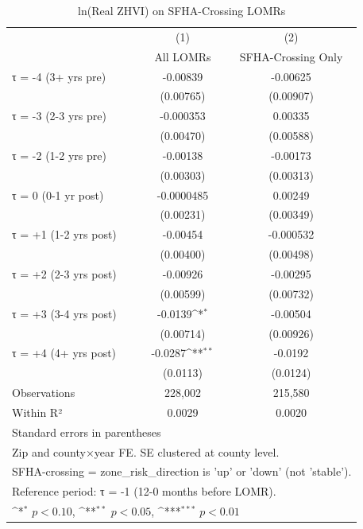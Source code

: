 \begin{table}[htbp]\centering
\def\sym#1{\ifmmode^{#1}\else\(^{#1}\)\fi}
\caption{ln(Real ZHVI) on SFHA-Crossing LOMRs}
\begin{tabular}{l*{2}{c}}
\hline\hline
                    &\multicolumn{1}{c}{(1)}&\multicolumn{1}{c}{(2)}\\
                    &\multicolumn{1}{c}{All LOMRs}&\multicolumn{1}{c}{SFHA-Crossing Only}\\
\hline
τ = -4 (3+ yrs pre) &    -0.00839         &    -0.00625         \\
                    &   (0.00765)         &   (0.00907)         \\
[1em]
τ = -3 (2-3 yrs pre)&   -0.000353         &     0.00335         \\
                    &   (0.00470)         &   (0.00588)         \\
[1em]
τ = -2 (1-2 yrs pre)&    -0.00138         &    -0.00173         \\
                    &   (0.00303)         &   (0.00313)         \\
[1em]
τ = 0 (0-1 yr post) &  -0.0000485         &     0.00249         \\
                    &   (0.00231)         &   (0.00349)         \\
[1em]
τ = +1 (1-2 yrs post)&    -0.00454         &   -0.000532         \\
                    &   (0.00400)         &   (0.00498)         \\
[1em]
τ = +2 (2-3 yrs post)&    -0.00926         &    -0.00295         \\
                    &   (0.00599)         &   (0.00732)         \\
[1em]
τ = +3 (3-4 yrs post)&     -0.0139\sym{*}  &    -0.00504         \\
                    &   (0.00714)         &   (0.00926)         \\
[1em]
τ = +4 (4+ yrs post)&     -0.0287\sym{**} &     -0.0192         \\
                    &    (0.0113)         &    (0.0124)         \\
\hline
Observations        &     228,002         &     215,580         \\
Within R²           &      0.0029         &      0.0020         \\
\hline\hline
\multicolumn{3}{l}{\footnotesize Standard errors in parentheses}\\
\multicolumn{3}{l}{\footnotesize Zip and county×year FE. SE clustered at county level.}\\
\multicolumn{3}{l}{\footnotesize SFHA-crossing = zone\_risk\_direction is 'up' or 'down' (not 'stable').}\\
\multicolumn{3}{l}{\footnotesize Reference period: τ = -1 (12-0 months before LOMR).}\\
\multicolumn{3}{l}{\footnotesize \sym{*} \(p<0.10\), \sym{**} \(p<0.05\), \sym{***} \(p<0.01\)}\\
\end{tabular}
\end{table}
